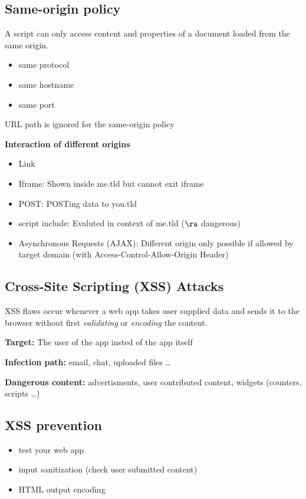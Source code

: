 \documentclass[fs, footer]{latex4ei}
\begin{document}
\begin{multicols*}{4}
\subsection{Same-origin policy}
A script can only access content and properties of a document loaded from the same origin.
\begin{itemize}
  \item same protocol
  \item same hostname
  \item same port
\end{itemize}
URL path is ignored for the same-origin policy

\textbf{Interaction of different origins}
\begin{itemize}
  \item Link
  \item Iframe: Shown inside me.tld but cannot exit iframe
  \item POST: POSTing data to you.tld
  \item script include: Evaluted in context of me.tld ($\ra$ dangerous)
  \item Asynchronous Requests (AJAX): Different origin only possible if allowed by target domain (with Access-Control-Allow-Origin Header)
\end{itemize}

\subsection{Cross-Site Scripting (XSS) Attacks}
XSS flaws occur whenever a web app takes user supplied data and sends it to the browser without first \emph{validating} or \emph{encoding} the content.

\textbf{Target:} The user of the app insted of the app itself

\textbf{Infection path:} email, chat, uploaded files \ldots

\textbf{Dangerous content:} advertisments, user contributed content, widgets (counters, scripts \ldots)

\subsection{XSS prevention}
\begin{itemize}
  \item test your web app
  \item input sanitization (check user submitted content)
  \item HTML output encoding
\end{itemize}


\end{multicols*}
\end{document}
